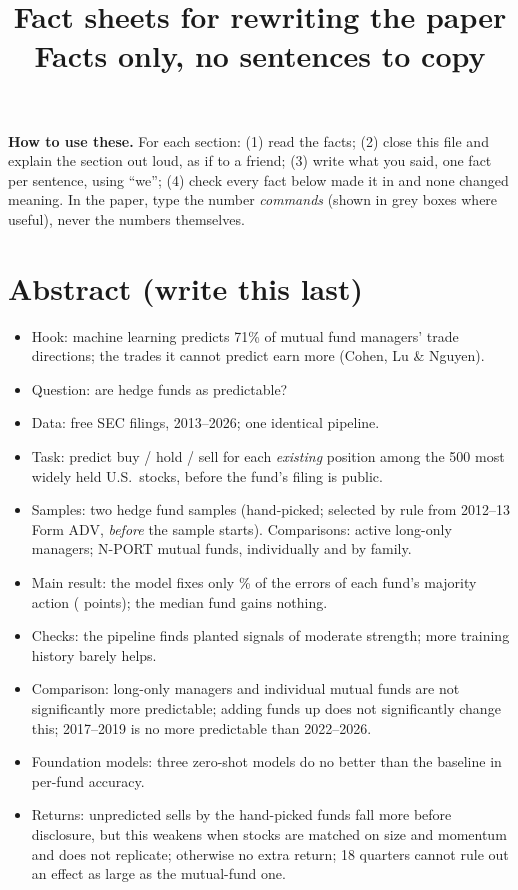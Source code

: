\documentclass[11pt]{article}
\title{Fact sheets for rewriting the paper\\\large Facts only, no sentences to copy}
\author{}
\date{}
\begin{document}
\maketitle

\noindent\textbf{How to use these.} For each section: (1) read the facts; (2) close
this file and explain the section out loud, as if to a friend; (3) write what you
said, one fact per sentence, using ``we''; (4) check every fact below made it in
and none changed meaning. In the paper, type the number \emph{commands} (shown in
grey boxes where useful), never the numbers themselves.

\section*{Abstract (write this last)}
\begin{itemize}
  \item Hook: machine learning predicts 71\% of mutual fund managers' trade
  directions; the trades it cannot predict earn more (Cohen, Lu \& Nguyen).
  \item Question: are hedge funds as predictable?
  \item Data: free SEC filings, 2013--2026; one identical pipeline.
  \item Task: predict buy / hold / sell for each \emph{existing} position among the
  500 most widely held U.S.\ stocks, before the fund's filing is public.
  \item Samples: two hedge fund samples (hand-picked; selected by rule from
  2012--13 Form ADV, \emph{before} the sample starts). Comparisons: active
  long-only managers; N-PORT mutual funds, individually and by family.
  \item Main result: the model fixes only \errredM\% of the errors of each fund's
  majority action (\gainM{} points); the median fund gains nothing.
  \item Checks: the pipeline finds planted signals of moderate strength; more
  training history barely helps.
  \item Comparison: long-only managers and individual mutual funds are not
  significantly more predictable; adding funds up does not significantly change
  this; 2017--2019 is no more predictable than 2022--2026.
  \item Foundation models: three zero-shot models do no better than the baseline
  in per-fund accuracy.
  \item Returns: unpredicted sells by the hand-picked funds fall more before
  disclosure, but this weakens when stocks are matched on size and momentum and
  does not replicate; otherwise no extra return; 18 quarters cannot rule out an
  effect as large as the mutual-fund one.
\end{itemize}
\end{document}

